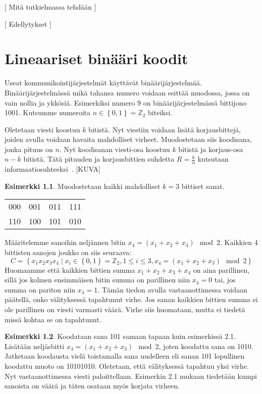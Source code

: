 \documentclass[a4paper,12pt,leqno,oneside]{report} %
\theoremstyle{plain}
\theoremstyle{definition}
\newtheorem{esimerkki}{Esimerkki}[chapter]
\theoremstyle{remark}
\numberwithin{equation}{chapter}
\newcommand*{\Zset}{\mathbb{Z}}  %
\begin{document}
    [ Mitä tutkielmassa tehdään ]


    [ Edellytykset ]

    \chapter{Lineaariset binääri koodit}\label{ch: Lineaariset binääri koodit}

    Useat kommunikointijärjestelmät käyttävät binäärijärjestelmää. Binäärijärjestelmässä mikä tahansa numero voidaan esittää muodossa, jossa on vain nollia ja ykkösiä. Esimerkiksi numero 9 on binäärijärjestelmässä bittijono 1001. Kutsumme numeroita $n \in \left\{ 0, 1 \right\} = \Zset_2$ biteiksi.

    Oletetaan viesti koostuu $k$ bitistä. Nyt viestiin voidaan lisätä korjausbittejä, joiden avulla voidaan havaita mahdolliset virheet. Muodostetaan siis koodisana, jonka pituus on $n$. Nyt koodisanan viesti-osa koostuu $k$ bitistä ja korjaus-osa $n-k$ bitistä. Tätä pituuden ja korjausbittien suhdetta $R = \frac{k}{n}$ kutsutaan informaatiosuhteeksi~\cite[s.~267]{GW}.
    [KUVA]
    \begin{esimerkki}
        Muodostetaan kaikki mahdolliset $k = 3$ bittiset sanat.
        \begin{center}
            \begin{tabular}[t]{llll}
                000 & 001 & 011 & 111 \\
                110 & 100 & 101 & 010 \\
            \end{tabular}
        \end{center}
        Määritelemme sanoihin neljännen bitin $x_4 = (x_1 + x_2 + x_3) \mod2$. Kaikkien 4 bittisten sanojen joukko on siis seuraava:
        \[
            C = \left\{ x_1x_2x_3x_4 \mid  x_i \in \left\{0,1\right\} = \Zset_2, 1 \le i \le 3, x_4 = (x_1 + x_2 + x_3) \mod2\right\}
        \]
        Huomaamme että kaikkien bittien summa $x_1 + x_2 + x_3 + x_4$ on aina parillinen, sillä jos kolmen ensimmäisen bitin summa on parillinen niin $x_4 = 0$ tai, jos summa on pariton niin $x_4 = 1$.
        Tämän tiedon avulla vastaanottimessa voidaan päätellä, onko välityksessä tapahtunut virhe. Jos sanan kaikkien bittien summa ei ole parillinen on viesti varmasti väärä. Virhe siis huomataan, mutta ei tiedetä missä kohtaa se on tapahtunut.
    \end{esimerkki}
    \begin{esimerkki}
        Koodataan sana 101 samaan tapaan kuin esimerkissä 2.1. Lisätään neljäsbitti $x_4 = (x_1 + x_2 + x_3) \mod2$, joten koodattu sana on 1010. Jatketaan koodausta vielä toistamalla sana uudelleen eli sanan 101 lopullinen koodattu muoto on 10101010. Oletetaan, että välityksessä tapahtuu yksi virhe. Nyt vastaanottimessa viesti paloittellaan. Esimerkin 2.1 mukaan tiedetään kumpi sanoista on väärä ja täten osataan myös korjata virheen.
    \end{esimerkki}
\end{document}
